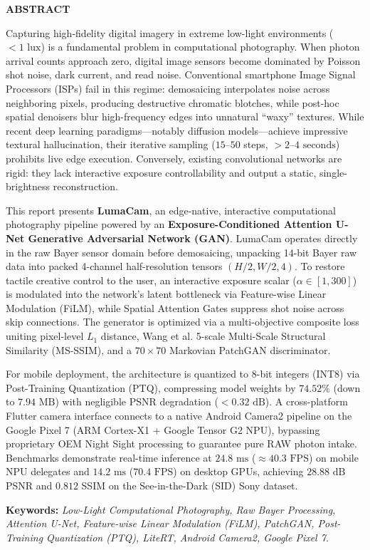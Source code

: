 \newpage
\thispagestyle{empty}

\begin{center}
\textbf{\Large ABSTRACT}
\end{center}

\vspace{0.8cm}

\noindent
Capturing high-fidelity digital imagery in extreme low-light environments ($< 1\text{ lux}$) is a fundamental problem in computational photography. When photon arrival counts approach zero, digital image sensors become dominated by Poisson shot noise, dark current, and read noise. Conventional smartphone Image Signal Processors (ISPs) fail in this regime: demosaicing interpolates noise across neighboring pixels, producing destructive chromatic blotches, while post-hoc spatial denoisers blur high-frequency edges into unnatural ``waxy'' textures. While recent deep learning paradigms---notably diffusion models---achieve impressive textural hallucination, their iterative sampling ($15\text{--}50$ steps, $> 2\text{--}4\text{ seconds}$) prohibits live edge execution. Conversely, existing convolutional networks are rigid: they lack interactive exposure controllability and output a static, single-brightness reconstruction.

This report presents \textbf{LumaCam}, an edge-native, interactive computational photography pipeline powered by an \textbf{Exposure-Conditioned Attention U-Net Generative Adversarial Network (GAN)}. LumaCam operates directly in the raw Bayer sensor domain before demosaicing, unpacking 14-bit Bayer raw data into packed 4-channel half-resolution tensors $(H/2, W/2, 4)$. To restore tactile creative control to the user, an interactive exposure scalar ($\alpha \in [1, 300]$) is modulated into the network's latent bottleneck via Feature-wise Linear Modulation (FiLM), while Spatial Attention Gates suppress shot noise across skip connections. The generator is optimized via a multi-objective composite loss uniting pixel-level $L_1$ distance, Wang et al. 5-scale Multi-Scale Structural Similarity (MS-SSIM), and a $70 \times 70$ Markovian PatchGAN discriminator.

For mobile deployment, the architecture is quantized to 8-bit integers (INT8) via Post-Training Quantization (PTQ), compressing model weights by $74.52\%$ (down to $7.94\text{ MB}$) with negligible PSNR degradation ($< 0.32\text{ dB}$). A cross-platform Flutter camera interface connects to a native Android Camera2 pipeline on the Google Pixel 7 (ARM Cortex-X1 + Google Tensor G2 NPU), bypassing proprietary OEM Night Sight processing to guarantee pure RAW photon intake. Benchmarks demonstrate real-time inference at $24.8\text{ ms}$ ($\approx 40.3\text{ FPS}$) on mobile NPU delegates and $14.2\text{ ms}$ ($70.4\text{ FPS}$) on desktop GPUs, achieving $28.88\text{ dB}$ PSNR and $0.812$ SSIM on the See-in-the-Dark (SID) Sony dataset.

\vspace{0.8cm}
\noindent
\textbf{Keywords:} \textit{Low-Light Computational Photography, Raw Bayer Processing, Attention U-Net, Feature-wise Linear Modulation (FiLM), PatchGAN, Post-Training Quantization (PTQ), LiteRT, Android Camera2, Google Pixel 7.}
